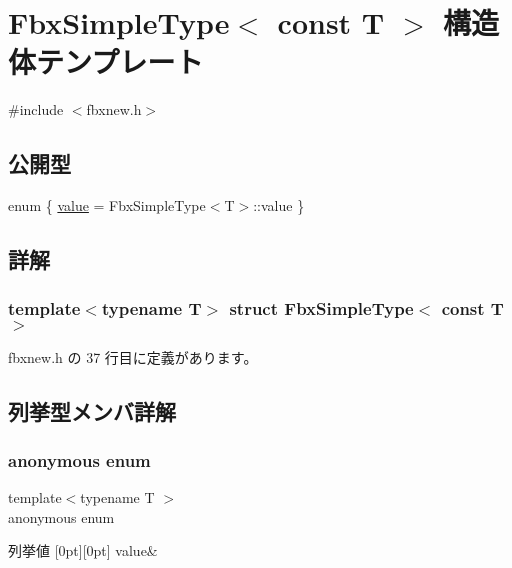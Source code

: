 \hypertarget{struct_fbx_simple_type_3_01const_01_t_01_4}{}\section{Fbx\+Simple\+Type$<$ const T $>$ 構造体テンプレート}
\label{struct_fbx_simple_type_3_01const_01_t_01_4}


{\ttfamily \#include $<$fbxnew.\+h$>$}

\subsection*{公開型}
\begin{DoxyCompactItemize}
\item 
enum \{ \hyperlink{struct_fbx_simple_type_3_01const_01_t_01_4_ac98b2314bdb5ea5924a3b67466977c73a70a474048a59b9fb1f5d7f4f743ea6ef}{value} = Fbx\+Simple\+Type$<$T$>$\+:\+:value
 \}
\end{DoxyCompactItemize}


\subsection{詳解}
\subsubsection*{template$<$typename T$>$\newline
struct Fbx\+Simple\+Type$<$ const T $>$}



 fbxnew.\+h の 37 行目に定義があります。



\subsection{列挙型メンバ詳解}
\mbox{\label{struct_fbx_simple_type_3_01const_01_t_01_4_ac98b2314bdb5ea5924a3b67466977c73}} 
\subsubsection{\texorpdfstring{anonymous enum}{anonymous enum}}
{\footnotesize\ttfamily template$<$typename T $>$ \\
anonymous enum}

\begin{DoxyEnumFields}{列挙値}
[0pt][0pt]{}\mbox{\label{struct_fbx_simple_type_3_01const_01_t_01_4_ac98b2314bdb5ea5924a3b67466977c73a70a474048a59b9fb1f5d7f4f743ea6ef}} 
value&\\
\hline

\end{DoxyEnumFields}


